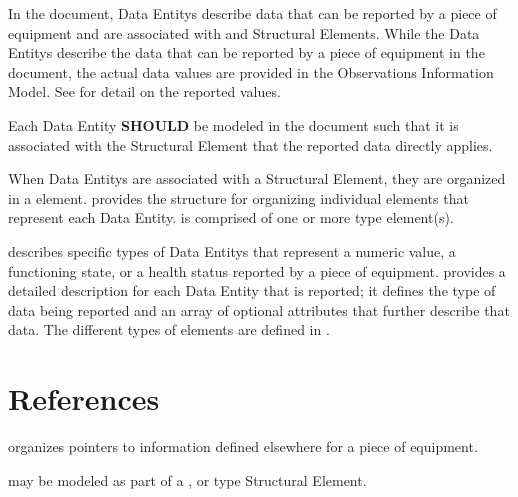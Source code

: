 In the  document, \glspl{Data Entity} describe data that can be reported by a piece of equipment and are associated with  and  \glspl{Structural Element}.   While the \glspl{Data Entity} describe the data that can be reported by a piece of equipment in the  document, the actual data values are provided in the \gls{Observations Information Model}.   See  for detail on the reported values.

Each \gls{Data Entity} \textbf{SHOULD} be modeled in the  document such that it is associated with the \gls{Structural Element} that the reported data directly applies.

When \glspl{Data Entity} are associated with a \gls{Structural Element}, they are organized in a  element.    provides the structure for organizing individual  elements that represent each \gls{Data Entity}.  is comprised of one or more  type element(s).

 describes specific types of \glspl{Data Entity} that represent a numeric value, a functioning state, or a health status reported by a piece of equipment.  provides a detailed description for each \gls{Data Entity} that is reported; it defines the type of data being reported and an array of optional attributes that further describe that data.   The different types of  elements are defined in .













\section{References}
\label{sec:References}

 organizes pointers to information defined elsewhere for a piece of equipment.

 may be modeled as part of a ,  or  type \gls{Structural Element}.

